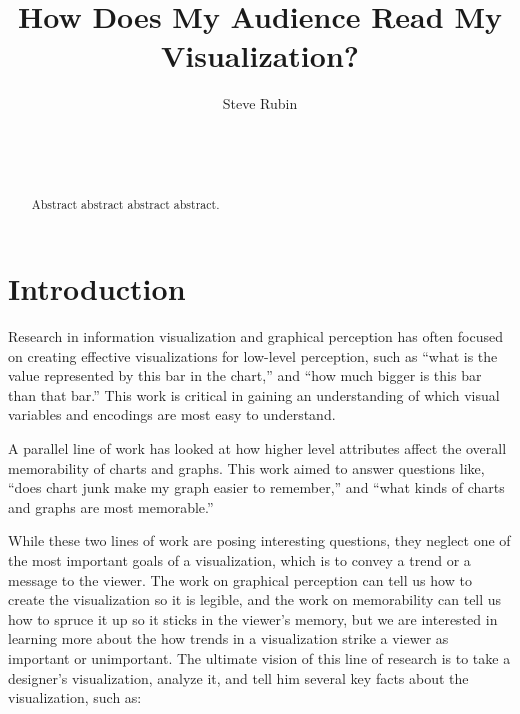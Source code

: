 \documentclass{sigchi}
\begin{document}
\title{How Does My Audience Read My Visualization?}

\author{
  \alignauthor Steve Rubin\\
    \\
    \\
    \\
}


\maketitle

\begin{abstract}
Abstract abstract abstract abstract.
\end{abstract}



\section{Introduction}

Research in information visualization and graphical perception has
often focused on creating effective visualizations for low-level
perception, such as ``what is the value represented by this bar in the
chart,'' and ``how much bigger is this bar than that bar.'' This work
is critical in gaining an understanding of which visual variables and
encodings are most easy to understand.

A parallel line of work has looked at how higher level attributes
affect the overall memorability of charts and graphs. This work aimed
to answer questions like, ``does chart junk make my graph easier to
remember,'' and ``what kinds of charts and graphs are most
memorable.''

While these two lines of work are posing interesting questions, they
neglect one of the most important goals of a visualization, which is
to convey a trend or a message to the viewer. The work on graphical
perception can tell us how to create the visualization so it is
legible, and the work on memorability can tell us how to spruce it up
so it sticks in the viewer's memory, but we are interested in learning
more about the how trends in a visualization strike a viewer as
important or unimportant. The ultimate vision of this line of research
is to take a designer's visualization, analyze it, and tell him
several key facts about the visualization, such as:
\end{document}
